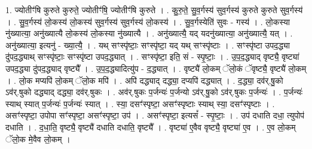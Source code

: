 \documentclass[17pt]{extarticle}
\begin{document}
1. ज्योतीꣳ॑षि कुरुते कुरुते॒ ज्योतीꣳ॑षि॒ ज्योतीꣳ॑षि कुरुते । . कु॒रु॒ते॒ सु॒व॒र्गस्य॑ सुव॒र्गस्य॑ कुरुते कुरुते सुव॒र्गस्य॑ । . सु॒व॒र्गस्य॑ लो॒कस्य॑ लो॒कस्य॑ सुव॒र्गस्य॑ सुव॒र्गस्य॑ लो॒कस्य॑ । . सु॒व॒र्गस्येति॑ सुवः - गस्य॑ । . लो॒कस्या नु॑ख्यात्या॒ अनु॑ख्यात्यै लो॒कस्य॑ लो॒कस्या नु॑ख्यात्यै । . अनु॑ख्यात्यै॒ यद् यदनु॑ख्यात्या॒ अनु॑ख्यात्यै॒ यत् । . अनु॑ख्यात्या॒ इत्यनु॑ - ख्या॒त्यै॒ । . यथ् सꣳस्पृ॑ष्टाः॒ सꣳस्पृ॑ष्टा॒ यद् यथ् सꣳस्पृ॑ष्टाः । . सꣳस्पृ॑ष्टा उपद॒द्ध्या दु॑पद॒द्ध्याथ् सꣳस्पृ॑ष्टाः॒ सꣳस्पृ॑ष्टा उपद॒द्ध्यात् । . सꣳस्पृ॑ष्टा॒ इति॒ सं - स्पृ॒ष्टाः॒ । . उ॒प॒द॒द्ध्याद् वृष्ट्यै॒ वृष्ट्या॑ उपद॒द्ध्या दु॑पद॒द्ध्याद् वृष्ट्यै᳚ । . उ॒प॒द॒द्ध्यादित्यु॑प - द॒द्ध्यात् । . वृष्ट्यै॑ लो॒कम् ॅलो॒कं ॅवृष्ट्यै॒ वृष्ट्यै॑ लो॒कम् । . लो॒क मप्यपि॑ लो॒कम् ॅलो॒क मपि॑ । . अपि॑ दद्ध्याद् दद्ध्या॒ दप्यपि॑ दद्ध्यात् । . द॒द्ध्या॒ दव॑र्.षु॒को ऽव॑र्.षुको दद्ध्याद् दद्ध्या॒ दव॑र्.षुकः । . अव॑र्.षुकः प॒र्जन्यः॑ प॒र्जन्यो ऽव॑र्.षु॒को ऽव॑र्.षुकः प॒र्जन्यः॑ । . प॒र्जन्यः॑ स्याथ् स्यात् प॒र्जन्यः॑ प॒र्जन्यः॑ स्यात् । . स्या॒ दसꣳ॑स्पृष्टा॒ असꣳ॑स्पृष्टाः स्याथ् स्या॒ दसꣳ॑स्पृष्टाः । . असꣳ॑स्पृष्टा॒ उपोपा सꣳ॑स्पृष्टा॒ असꣳ॑स्पृष्टा॒ उप॑ । . असꣳ॑स्पृष्टा॒ इत्यसं᳚ - स्पृ॒ष्टाः॒ । . उप॑ दधाति दधा॒ त्युपोप॑ दधाति । . द॒धा॒ति॒ वृष्ट्यै॒ वृष्ट्यै॑ दधाति दधाति॒ वृष्ट्यै᳚ । . वृष्ट्या॑ ए॒वैव वृष्ट्यै॒ वृष्ट्या॑ ए॒व । . ए॒व लो॒कम् ॅलो॒क मे॒वैव लो॒कम् । \newline
\end{document}
